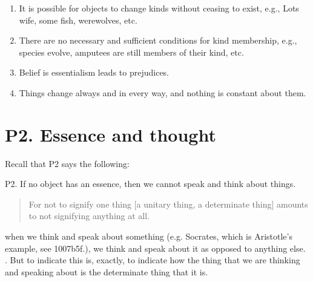 \documentclass[article,oneside]{memoir}
\begin{document}
\begin{enumerate}
\item It is possible for objects to change kinds without ceasing to exist, e.g., Lots wife, some fish, werewolves, etc.
\item There are no necessary and sufficient conditions for kind membership, e.g., species evolve, amputees are still members of their kind, etc.
\item Belief is essentialism leads to prejudices. 
\item Things change always and in every way, and nothing is constant about them.
\end{enumerate}

\section{P2. Essence and thought}

Recall that P2 says the following: 

\item P2. If no object has an essence, then we cannot speak and think about things. 

\begin{quote}
For not to signify one thing [a unitary thing, a determinate thing] amounts to not signifying anything at all.
\end{quote}

when we think and speak about something (e.g. Socrates, which is Aristotle’s example, see 1007b5f.), we think and speak about it as opposed to anything else. . But to indicate this is, exactly, to indicate how the thing that we are thinking and speaking about is the determinate thing that it is.
\end{document}
